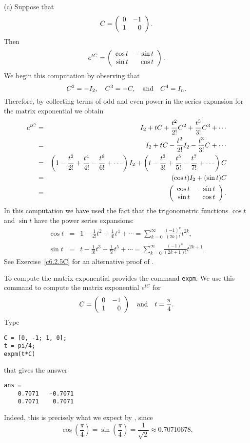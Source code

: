 \documentclass{ximera}
\begin{document}
\noindent (c) \quad Suppose that
     \[
                C = \left(\begin{array}{rr} 0 & -1\\ 1 &0\end{array}\right).
      \]
Then
\begin{equation} \label{e:exprotate}
e^{tC} = \left(\begin{array}{rr} \cos t & -\sin t\\ \sin t &\cos t\end{array}\right).
\end{equation}
We begin this computation by observing that
\[
C^2 = -I_2, \quad C^3 = -C, \quad\mbox{and}\quad C^4 = I_n.
\]
Therefore, by collecting terms of odd and even power in the series
expansion for the matrix exponential we obtain
\begin{eqnarray*}
e^{tC} & = & I_2 + tC + \frac{t^2}{2!} C^2 +  \frac{t^3}{3!}C^3 +\cdots\\
     & = & I_2 + tC - \frac{t^2}{2!}I_2 - \frac{t^3}{3!}C +\cdots\\
     & = & \left(1 - \frac{t^2}{2!} + \frac{t^4}{4!} - \frac{t^6}{6!} +
		\cdots \right)I_2
	 + \left(t - \frac{t^3}{3!} + \frac{t^5}{5!} - \frac{t^7}{7!} +
	\cdots \right)C \\
     & = & (\cos t)I_2 + (\sin t)C \\
     & = & \left(\begin{array}{rr} \cos t & -\sin t\\ \sin t &\cos t\end{array}\right).
     \end{eqnarray*}
In this computation we have used the fact that the trigonometric
functions $\cos t$ and $\sin t$ have the power series expansions:
\begin{eqnarray*}
\cos t & = & 1-\frac{1}{2!}t^2+\frac{1}{4!} t^4 + \cdots =
\sum\limits_{k=0}^\infty\frac{(-1)^k}{(2k)!} t^{2k},\\
\sin t & = & t-\frac{1}{3!} t^3 + \frac{1}{5!} t^5 + \cdots
   = \sum\limits_{k=0}^\infty \frac{(-1)^k}{(2k+1)!} t^{2k+1}.
\end{eqnarray*}
See Exercise~\ref{c6.2.5C} for an alternative proof of .

To compute the matrix exponential
\Matlab{} provides the command
{\tt expm}.  We use this command to compute
the matrix exponential $e^{tC}$ for
\[
C=\left(\begin{array}{rr} 0 & -1\\ 1 &0\end{array}\right) \quad\mbox{and}\quad t=\frac{\pi}{4}.
\]
Type
\begin{verbatim}
C = [0, -1; 1, 0];
t = pi/4;
expm(t*C)
\end{verbatim}
that gives the answer
\begin{verbatim}
ans =
    0.7071   -0.7071
    0.7071    0.7071
\end{verbatim}
Indeed, this is precisely what we expect by ,
since
\[
\cos\left(\frac{\pi}{4}\right)=\sin\left(\frac{\pi}{4}\right)=
\frac{1}{\sqrt{2}}\approx 0.70710678.
\]
\end{document}
